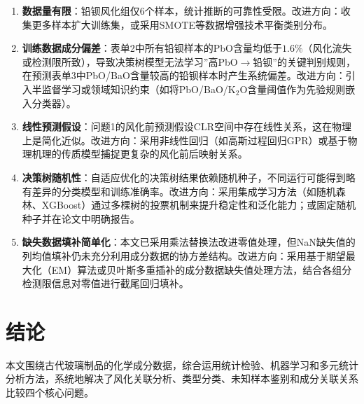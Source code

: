 \documentclass[12pt,a4paper]{ctexart}
\begin{document}
\begin{enumerate}[label=(\arabic*), leftmargin=*]
    \item \textbf{数据量有限}：铅钡风化组仅6个样本，统计推断的可靠性受限。改进方向：收集更多样本扩大训练集，或采用SMOTE等数据增强技术平衡类别分布。
    \item \textbf{训练数据成分偏差}：表单2中所有铅钡样本的PbO含量均低于$1.6\%$（风化流失或检测限所致），导致决策树模型无法学习”高PbO$\rightarrow$铅钡”的关键判别规则，在预测表单3中PbO/BaO含量较高的铅钡样本时产生系统偏差。改进方向：引入半监督学习或领域知识约束（如将PbO/BaO/K$_2$O含量阈值作为先验规则嵌入分类器）。
    \item \textbf{线性预测假设}：问题1的风化前预测假设CLR空间中存在线性关系，这在物理上是简化近似。改进方向：采用非线性回归（如高斯过程回归GPR）或基于物理机理的传质模型捕捉更复杂的风化前后映射关系。
    \item \textbf{决策树随机性}：自适应优化的决策树结果依赖随机种子，不同运行可能得到略有差异的分类模型和训练准确率。改进方向：采用集成学习方法（如随机森林、XGBoost）通过多棵树的投票机制来提升稳定性和泛化能力；或固定随机种子并在论文中明确报告。
    \item \textbf{缺失数据填补简单化}：本文已采用乘法替换法改进零值处理，但NaN缺失值的列均值填补仍未充分利用成分数据的协方差结构。改进方向：采用基于期望最大化（EM）算法或贝叶斯多重插补的成分数据缺失值处理方法\cite{11}，结合各组分检测限信息对零值进行截尾回归填补。
\end{enumerate}

\newpage

\section{结论}

本文围绕古代玻璃制品的化学成分数据，综合运用统计检验、机器学习和多元统计分析方法，系统地解决了风化关联分析、类型分类、未知样本鉴别和成分关联关系比较四个核心问题。
\end{document}
